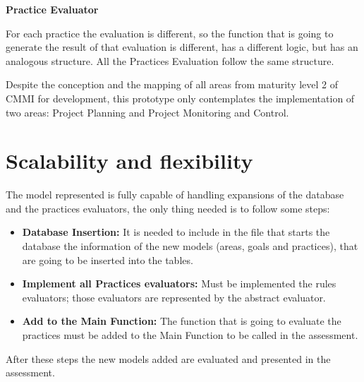 \vspace{1cm}

\textbf{Practice Evaluator}

For each practice the evaluation is different, so the function that is going to generate the result of that evaluation is different, has a different logic, but has an analogous structure. All the Practices Evaluation follow the same structure.

\vspace{1cm}

Despite the conception and the mapping of all areas from maturity level 2 of CMMI for development, this prototype only contemplates the implementation of two areas: Project Planning and Project Monitoring and Control.

\section{Scalability and flexibility}

The model represented is fully capable of handling expansions of the database and the practices evaluators, the only thing needed is to follow some steps:
\begin{itemize}
	\item \textbf{Database Insertion: } It is needed to include in the file that starts the database the information of the new models (areas, goals and practices), that are going to be inserted into the tables.
	\item \textbf{Implement all Practices evaluators: } Must be implemented the rules evaluators; those evaluators are represented by the abstract evaluator.
	\item \textbf{Add to the Main Function: } The function that is going to evaluate the practices must be added to the Main Function to be called in the assessment.
\end{itemize}

After these steps the new models added are evaluated and presented in the assessment.
